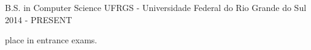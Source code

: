 \begin{cventries}
  \cventry
    {B.S. in Computer Science}
    {UFRGS - Universidade Federal do Rio Grande do Sul}
    {}
    {2014 - PRESENT}
    {
      \begin{cvitems}
        \item { place in entrance exams.}
      \end{cvitems}
    }
\end{cventries}
